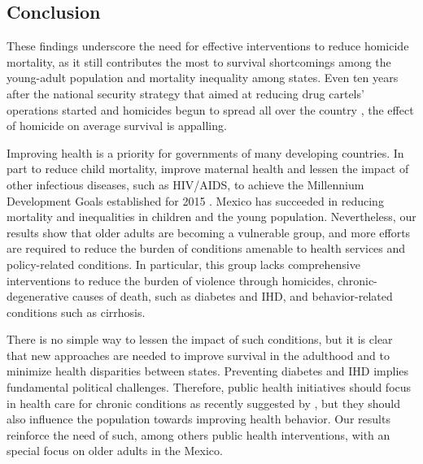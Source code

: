 \documentclass{bmcart}
\begin{document}
	

\subsection*{Conclusion}
These findings underscore the need for effective interventions to reduce homicide mortality, as it still contributes the most to survival shortcomings among the young-adult population and mortality inequality among states. Even ten years after the national security strategy that aimed at reducing drug cartels' operations started and homicides begun to spread all over the country \cite{espinal2015analysis}, the effect of homicide on average survival is appalling.

Improving health is a priority for governments of many developing countries. In part to reduce child mortality, improve maternal health and lessen the impact of other infectious diseases, such as HIV/AIDS, to achieve the Millennium Development Goals established for 2015 \cite{united2009millennium}.  Mexico has succeeded in reducing mortality and inequalities in children and the young population. Nevertheless, our results show that older adults are becoming a vulnerable group, and more efforts are required to reduce the burden of conditions amenable to health services and policy-related conditions. In particular, this group lacks comprehensive interventions to reduce the burden of violence through homicides, chronic-degenerative causes of death, such as diabetes and IHD, and behavior-related conditions such as cirrhosis.  

There is no simple way to lessen the impact of such conditions, but it is clear that new approaches are needed to improve survival in the adulthood and to minimize health disparities between states. Preventing diabetes and IHD implies fundamental political challenges. Therefore,  public health initiatives should focus in health care for chronic conditions as recently suggested by \cite{knaul2015achieving}, but they should also influence the population towards improving health behavior. Our results reinforce the need of such, among others public health interventions, with an special focus on older adults in the Mexico. 


\end{document}
